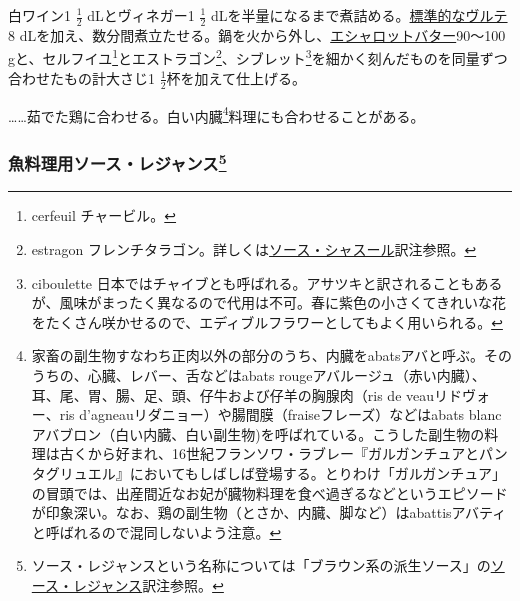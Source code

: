 \begin{recette}


白ワイン1 \(\frac{1}{2}\) dLとヴィネガー1 \(\frac{1}{2}\)
dLを半量になるまで煮詰める。\protect\hyperlink{veloute}{標準的なヴルテ}8
dLを加え、数分間煮立たせる。鍋を火から外し、\protect\hyperlink{beurre-d-echalote}{エシャロットバター}90〜100
gと、セルフイユ\footnote{cerfeuil チャービル。}とエストラゴン\footnote{estragon
  フレンチタラゴン。詳しくは\protect\hyperlink{sauce-chasseur}{ソース・シャスール}訳注参照。}、シブレット\footnote{ciboulette
  日本ではチャイブとも呼ばれる。アサツキと訳されることもあるが、風味がまったく異なるので代用は不可。春に紫色の小さくてきれいな花をたくさん咲かせるので、エディブルフラワーとしてもよく用いられる。}を細かく刻んだものを同量ずつ合わせたもの計大さじ1
\(\frac{1}{2}\)杯を加えて仕上げる。

\ldots{}\ldots{}茹でた鶏に合わせる。白い内臓\footnote{家畜の副生物すなわち正肉以外の部分のうち、内臓をabatsアバと呼ぶ。そのうちの、心臓、レバー、舌などはabats
  rougeアバルージュ（赤い内臓）、耳、尾、胃、腸、足、頭、仔牛および仔羊の胸腺肉（ris
  de veauリドヴォー、ris
  d'agneauリダニョー）や腸間膜（fraiseフレーズ）などはabats
  blancアバブロン（白い内臓、白い副生物)を呼ばれている。こうした副生物の料理は古くから好まれ、16世紀フランソワ・ラブレー『ガルガンチュアとパンタグリュエル』においてもしばしば登場する。とりわけ「ガルガンチュア」の冒頭では、出産間近なお妃が臓物料理を食べ過ぎるなどというエピソードが印象深い。なお、鶏の副生物（とさか、内臓、脚など）はabattisアバティと呼ばれるので混同しないよう注意。}料理にも合わせることがある。

\hypertarget{sauce-regence-pour-poissons}{%
\subsubsection[魚料理用ソース・レジャンス]{\texorpdfstring{魚料理用ソース・レジャンス\footnote{ソース・レジャンスという名称については「ブラウン系の派生ソース」の\protect\hyperlink{sauce-regence}{ソース・レジャンス}訳注参照。}}{魚料理用ソース・レジャンス}}\label{sauce-regence-pour-poissons}}



\end{recette}
